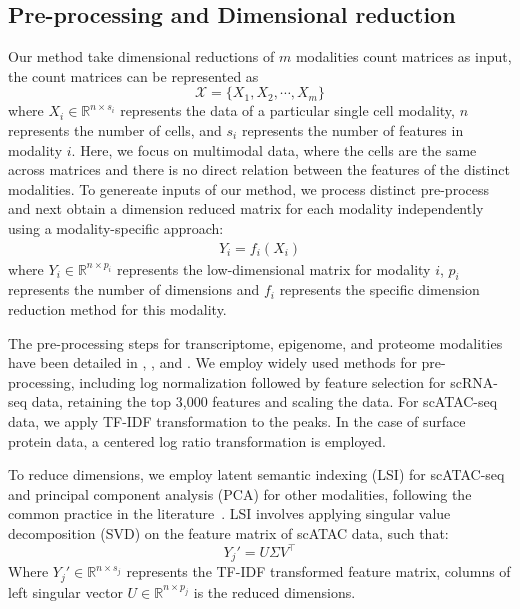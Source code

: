 \subsection{Pre-processing and Dimensional reduction}
Our method take dimensional reductions of $m$ modalities count matrices as input, the count matrices can be represented as
\begin{equation}
    \mathcal{X}=\{X_1,X_2,\cdots,X_m\}
\end{equation}
where $X_{i} \in \mathbb{R}^{n\times s_{i}}$ represents the data of a particular single cell modality, $n$ represents the number of cells, and $s_{i}$ represents the number of features in modality $i$. Here, we focus on multimodal data, where the cells are the same across matrices and there is no direct relation between the features of the distinct modalities. To genereate inputs of our method, we process distinct pre-process and next obtain a dimension reduced matrix for each modality independently using a modality-specific approach: 
\begin{align}
    Y_{i}=f_{i}(X_{i})
\end{align}
where $Y_{i} \in \mathbb{R}^{n\times p_{i}}$ represents the low-dimensional matrix for modality $i$, $p_{i}$ represents the number of dimensions and $f_{i}$ represents the specific dimension reduction method for this modality. 

The pre-processing steps for transcriptome, epigenome, and proteome modalities have been detailed in , , and . We employ widely used methods for pre-processing, including log normalization followed by feature selection for scRNA-seq data, retaining the top 3,000 features and scaling the data. For scATAC-seq data, we apply TF-IDF transformation to the peaks. In the case of surface protein data, a centered log ratio transformation is employed.


To reduce dimensions, we employ latent semantic indexing (LSI) for scATAC-seq and principal component analysis (PCA) for other modalities, following the common practice in the literature~\cite{granja2021archr, signac, hao2021seurat4}. LSI involves applying singular value decomposition (SVD) on the feature matrix of scATAC data, such that:
\begin{equation}
    Y_{j}' = U\Sigma V^\top
\end{equation}
Where $Y_{j}'\in \mathbb{R}^{n\times s_{j}}$ represents the TF-IDF transformed feature matrix, columns of left singular vector $U\in \mathbb{R}^{n\times p_j}$ is the reduced dimensions.  

